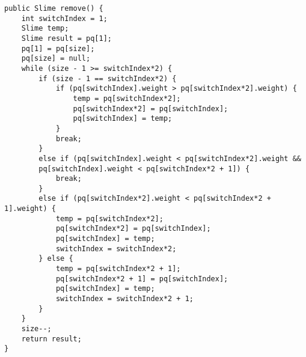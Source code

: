 \clearpage
\begin{blocksection}
\begin{solution}
\begin{lstlisting}
public Slime remove() {
    int switchIndex = 1;
    Slime temp;
    Slime result = pq[1];
    pq[1] = pq[size]; 
    pq[size] = null;
    while (size - 1 >= switchIndex*2) {
        if (size - 1 == switchIndex*2) {
            if (pq[switchIndex].weight > pq[switchIndex*2].weight) {
                temp = pq[switchIndex*2];
                pq[switchIndex*2] = pq[switchIndex];
                pq[switchIndex] = temp;
            }
            break;
        }
        else if (pq[switchIndex].weight < pq[switchIndex*2].weight &&
        pq[switchIndex].weight < pq[switchIndex*2 + 1]) {
            break;
        }
        else if (pq[switchIndex*2].weight < pq[switchIndex*2 + 1].weight) {
            temp = pq[switchIndex*2];
            pq[switchIndex*2] = pq[switchIndex];
            pq[switchIndex] = temp;
            switchIndex = switchIndex*2;
        } else {
            temp = pq[switchIndex*2 + 1];
            pq[switchIndex*2 + 1] = pq[switchIndex];
            pq[switchIndex] = temp;
            switchIndex = switchIndex*2 + 1;
        }
    }
    size--;
    return result;
}
\end{lstlisting}
\end{solution}
\clearpage
\end{blocksection}